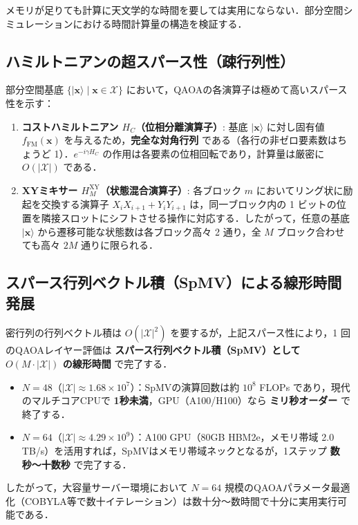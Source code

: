\documentclass[11pt,a4paper]{ltjsarticle}
\newcommand{\ket}[1]{|#1\rangle}
\begin{document}
メモリが足りても計算に天文学的な時間を要しては実用にならない．部分空間シミュレーションにおける時間計算量の構造を検証する．

\vspace{-1mm}
\subsection{ハミルトニアンの超スパース性（疎行列性）}
部分空間基底 $\{\ket{\bm{x}} \mid \bm{x} \in \mathcal{X}\}$ において，QAOAの各演算子は極めて高いスパース性を示す：
\begin{enumerate}\setlength{\itemsep}{0.5pt}
    \item \textbf{コストハミルトニアン $H_C$（位相分離演算子）}:
    基底 $\ket{\bm{x}}$ に対し固有値 $f_{\mathrm{FM}}(\bm{x})$ を与えるため，\textbf{完全な対角行列} である（各行の非ゼロ要素数はちょうど 1）．$e^{-i \gamma H_C}$ の作用は各要素の位相回転であり，計算量は厳密に $O(|\mathcal{X}|)$ である．
    \item \textbf{XYミキサー $H_M^{\mathrm{XY}}$（状態混合演算子）}:
    各ブロック $m$ においてリング状に励起を交換する演算子 $X_i X_{i+1} + Y_i Y_{i+1}$ は，同一ブロック内の 1 ビットの位置を隣接スロットにシフトさせる操作に対応する．したがって，任意の基底 $\ket{\bm{x}}$ から遷移可能な状態数は各ブロック高々 2 通り，全 $M$ ブロック合わせても高々 $2M$ 通りに限られる．
\end{enumerate}

\vspace{-1mm}
\subsection{スパース行列ベクトル積（SpMV）による線形時間発展}
密行列の行列ベクトル積は $O(|\mathcal{X}|^2)$ を要するが，上記スパース性により，1 回のQAOAレイヤー評価は \textbf{スパース行列ベクトル積（SpMV）として $O(M \cdot |\mathcal{X}|)$ の線形時間} で完了する．
\begin{itemize}\setlength{\itemsep}{0.5pt}
    \item $N=48$（$|\mathcal{X}| \approx 1.68 \times 10^7$）：SpMVの演算回数は約 $10^8$ FLOPs であり，現代のマルチコアCPUで \textbf{1秒未満}，GPU（A100/H100）なら \textbf{ミリ秒オーダー} で終了する．
    \item $N=64$（$|\mathcal{X}| \approx 4.29 \times 10^9$）：A100 GPU（80GB HBM2e，メモリ帯域 2.0 TB/s）を活用すれば，SpMVはメモリ帯域ネックとなるが，1ステップ \textbf{数秒〜十数秒} で完了する．
\end{itemize}
したがって，大容量サーバー環境において $N=64$ 規模のQAOAパラメータ最適化（COBYLA等で数十イテレーション）は数十分〜数時間で十分に実用実行可能である．
\end{document}

